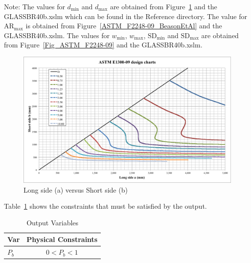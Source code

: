 \documentclass[12pt]{article}
\begin{document}
Note: The values for $d_\text{min}$ and $d_\text{max}$ are obtained from Figure~\ref{Fig_ASTM_E1300-09}
and the GLASS\textunderscore BR\textunderscore 40b.xslm which can be found in the 
Reference directory. The value for $\mbox{AR}_\text{max}$ is obtained from Figure~\ref{ASTM_F2248-09_BeasonEtAl}
and the GLASS\textunderscore BR\textunderscore 40b.xslm.
The values for $w_\text{min}$, $w_\text{max}$, $\text{SD}_\text{min}$ and $\text{SD}_\text{max}$
are obtained from Figure~\ref{Fig_ASTM_F2248-09} and the GLASS\textunderscore BR\textunderscore 40b.xslm. 
\newline

\begin{figure}[h!]
  \begin{center}
    \includegraphics[width=\textwidth]{ASTM_E1300-09_design_charts.png}
    \caption{Long side (a) versus Short side (b)}
    \label{Fig_ASTM_E1300-09}
  \end{center}
\end{figure}

Table~\ref{TblOutputVar} shows the constraints that must be satisfied by the output.

\begin{table}[!h]
\caption{Output Variables} \label{TblOutputVar}
\renewcommand{\arraystretch}{1.2}
\begin{center}
\begin{tabular}{l c} 
\toprule
\textbf{Var} & \textbf{Physical Constraints} \\
\midrule 
$P_b$ & $0 < P_b < 1$\\
\bottomrule
\end{tabular}
\end{center}
\end{table}
  
\end{document}

